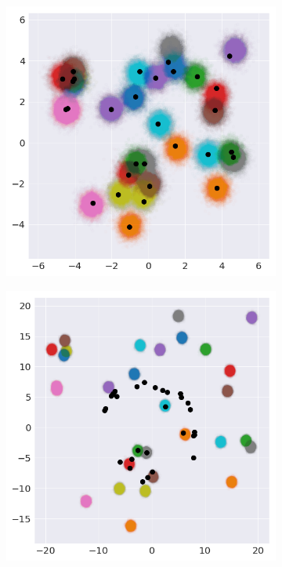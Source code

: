 \begin{figure}
\centering     %
\begin{subfigure}[b]{0.49\linewidth}
    \includegraphics[width=\linewidth]{images/chapter5/toy_gaussian/gaussian_only_test_set_mu.png}
    \caption{}
\end{subfigure}
\begin{subfigure}[b]{0.49\linewidth}
    \includegraphics[width=\linewidth]{images/chapter5/toy_gaussian/gaussian_only_out_of_sample_set_mu.png}

\end{subfigure}
\end{figure}
